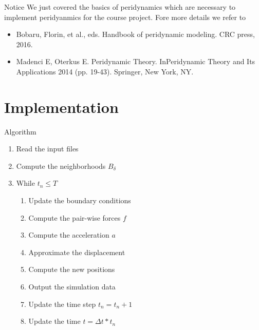 \documentclass[\classoption]{beamer}
\begin{document}
\begin{frame}{Notice}
We just covered the basics of peridynamics which are necessary to implement peridyanmics for the course project. Fore more details we refer to 
\begin{itemize}
\item Bobaru, Florin, et al., eds. Handbook of peridynamic modeling. CRC press, 2016.
\item Madenci E, Oterkus E. Peridynamic Theory. InPeridynamic Theory and Its Applications 2014 (pp. 19-43). Springer, New York, NY.
\end{itemize}

\end{frame}

\section{Implementation}

\begin{frame}{Algorithm}

\begin{enumerate}
\item Read the input files
\item Compute the neighborhoods $B_\delta$
\item While $t_n \leq T$
\begin{enumerate}
\item Update the boundary conditions 
\item Compute the pair-wise forces $f$
\item Compute the acceleration $a$
\item Approximate the displacement
\item Compute the new positions
\item Output the simulation data
\item Update the time step $t_n = t_n + 1$
\item Update the time $t=\Delta t * t_n$
\end{enumerate} 
\end{enumerate}

\end{frame}


\end{document}
